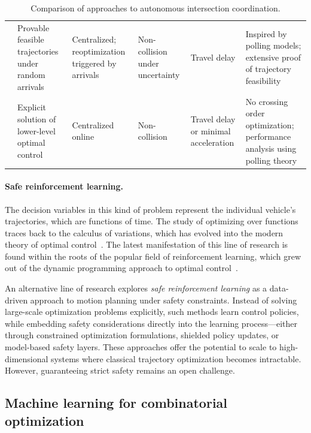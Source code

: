 \documentclass[a4paper]{report}
\theoremstyle{definition}
\theoremstyle{plain}
\begin{document}
\begin{table}[t]
\begin{adjustbox}{center}
{\begin{tabularx}{2.0\textwidth}{@{} l L{0.7} L{0.45} L{0.35} L{0.45} L{0.7} @{}}
\cite{miculescuPollingsystemsbasedAutonomousVehicle2016} &
Provable feasible trajectories under random arrivals  &
Centralized; reoptimization triggered by arrivals &
Non-collision under uncertainty &
Travel delay &
Inspired by polling models; extensive proof of trajectory feasibility  \\

\cite{timmermanPlatoonFormingAlgorithms2021} &
Explicit solution of lower-level optimal control  &
Centralized online &
Non-collision &
Travel delay or minimal acceleration &
No crossing order optimization; performance analysis using polling theory  \\
  
\bottomrule
\end{tabularx}}
\end{adjustbox}
\caption{Comparison of approaches to autonomous intersection coordination.}
\label{tab:litreview}
\end{table}

\paragraph{Safe reinforcement learning.}
The decision variables in this kind of problem represent the individual
vehicle's trajectories, which are functions of time.
%
The study of optimizing over functions traces back to the calculus of
variations, which has evolved into the modern theory of optimal
control~\cite{liberzonCalculusVariationsOptimal}.
%
The latest manifestation of this line of research is found within the roots of
the popular field of reinforcement learning, which grew out of the dynamic
programming approach to optimal
control~\cite{bellmanDynamicProgramming1984,bertsekas2012dynamic,putermanMarkovDecisionProcesses2009,suttonReinforcementLearningIntroduction2018}.

An alternative line of research explores \emph{safe reinforcement learning } as
a data-driven approach to motion planning under safety constraints. Instead of
solving large-scale optimization problems explicitly, such methods learn control
policies, while embedding safety considerations directly into the learning
process—either through constrained optimization formulations, shielded policy
updates, or model-based safety layers. These approaches offer the potential to
scale to high-dimensional systems where classical trajectory optimization
becomes intractable. However, guaranteeing strict safety remains an open
challenge.

\subsection{Machine learning for combinatorial optimization}
\end{document}
